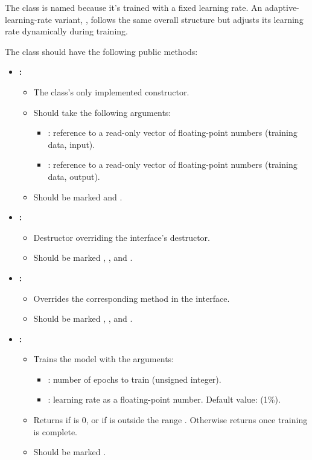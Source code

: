 The class is named  because it's trained with a fixed learning rate. An
adaptive-learning-rate variant, , follows the same overall structure but adjusts its
learning rate dynamically during training.

The class should have the following public methods:
\begin{itemize}
  \item \textbf{:}
  \begin{itemize}
    \item The class's only implemented constructor.
    \item Should take the following arguments:
    \begin{itemize}
      \item {}: reference to a read-only vector of floating-point numbers (training
        data, input).
      \item {}: reference to a read-only vector of floating-point numbers (training
        data, output).
    \end{itemize}
    \item Should be marked  and .
  \end{itemize}
  \item \textbf{:}
  \begin{itemize}
    \item Destructor overriding the interface's destructor.
    \item Should be marked , , and .
  \end{itemize}
  \item \textbf{:}
  \begin{itemize}
    \item Overrides the corresponding method in the interface.
    \item Should be marked , , and .
  \end{itemize}
  \item \textbf{:}
  \begin{itemize}
    \item Trains the model with the arguments:
    \begin{itemize}
      \item {}: number of epochs to train (unsigned integer).
      \item {}: learning rate as a floating-point number. Default value:
         (1\%).
    \end{itemize}
    \item Returns  if  is 0, or if  is outside the
      range . Otherwise returns  once training is complete.
    \item Should be marked .
  \end{itemize}
\end{itemize}
